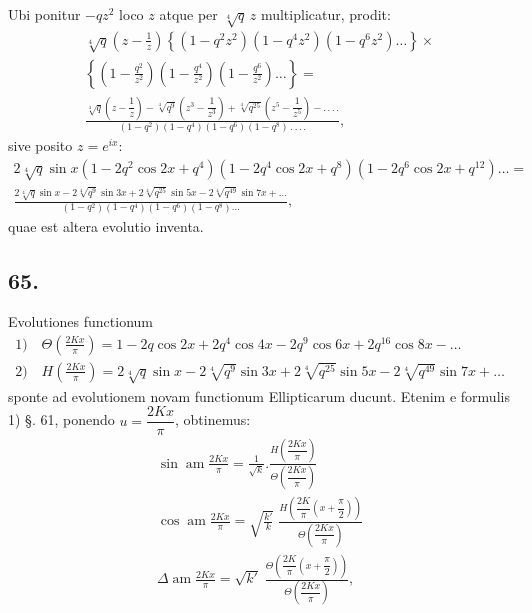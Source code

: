 \documentclass{article}
\begin{document}
Ubi ponitur $-qz^{2}$ loco $z$ atque per $\sqrt[4]{q}\,z$ multiplicatur, prodit:
\[
\begin{gathered}
\sqrt[4]{q}\left(z-\frac{1}{z}\right)\left\{(1-q^{2}z^{2})(1-q^{4}z^{2})(1-q^{6}z^{2})\ldots\right\}\times\\[1.5ex]
\left\{\left(1-\frac{q^{2}}{z^{2}}\right)\left(1-\frac{q^{4}}{z^{2}}\right)\left(1-\frac{q^{6}}{z^{2}}\right)\ldots\right\}=\\[1.5ex]
\frac{\sqrt[4]{q}\left(z-\dfrac{1}{z}\right)-\sqrt[4]{q^{9}}\left(z^{3}-\dfrac{1}{z^{3}}\right)+\sqrt[4]{q^{25}}\left(z^{5}-\dfrac{1}{z^{5}}\right)-.\,.\,.\,.}{(1-q^{2})(1-q^{4})(1-q^{6})(1-q^{8})\,.\,.\,.\,.},
\end{gathered}
\]
sive posito $z=e^{ix}$:
\[
\begin{gathered}
2\sqrt[4]{q}\sin x(1-2q^{2}\cos 2x+q^{4})(1-2q^{4}\cos 2x+q^{8})(1-2q^{6}\cos 2x+q^{12})\ldots=\\[1.5ex]
\frac{2\sqrt[4]{q}\sin x-2\sqrt[4]{q^{9}}\sin 3x+2\sqrt[4]{q^{25}}\sin 5x-2\sqrt[4]{q^{49}}\sin 7x+\ldots}{(1-q^{2})(1-q^{4})(1-q^{6})(1-q^{8})\ldots},
\end{gathered}
\]
quae est altera evolutio inventa.

\subsection*{65.}

Evolutiones functionum
\[
\begin{gathered}
\text{1)}\quad\Theta\left(\frac{2Kx}{\pi}\right)=1-2q\cos 2x+2q^{4}\cos 4x-2q^{9}\cos 6x+2q^{16}\cos 8x-\ldots\\[1.5ex]
\text{2)}\quad H\left(\frac{2Kx}{\pi}\right)=2\sqrt[4]{q}\sin x-2\sqrt[4]{q^{9}}\sin 3x+2\sqrt[4]{q^{25}}\sin 5x-2\sqrt[4]{q^{49}}\sin 7x+\ldots
\end{gathered}
\]
sponte ad evolutionem novam functionum Ellipticarum ducunt. Etenim e formulis 1) §. 61, ponendo $u=\dfrac{2Kx}{\pi}$, obtinemus:
\[
\begin{gathered}
\sin\operatorname{am}\frac{2Kx}{\pi}=\frac{1}{\sqrt{k}}.\frac{H\left(\dfrac{2Kx}{\pi}\right)}{\Theta\left(\dfrac{2Kx}{\pi}\right)}\\[2ex]
\cos\operatorname{am}\frac{2Kx}{\pi}=\sqrt{\frac{k'}{k}}\;\frac{H\left(\dfrac{2K}{\pi}\left(x+\dfrac{\pi}{2}\right)\right)}{\Theta\left(\dfrac{2Kx}{\pi}\right)}\\[2ex]
\Delta\operatorname{am}\frac{2Kx}{\pi}=\sqrt{k'}\;\frac{\Theta\left(\dfrac{2K}{\pi}\left(x+\dfrac{\pi}{2}\right)\right)}{\Theta\left(\dfrac{2Kx}{\pi}\right)},
\end{gathered}
\]
\end{document}
